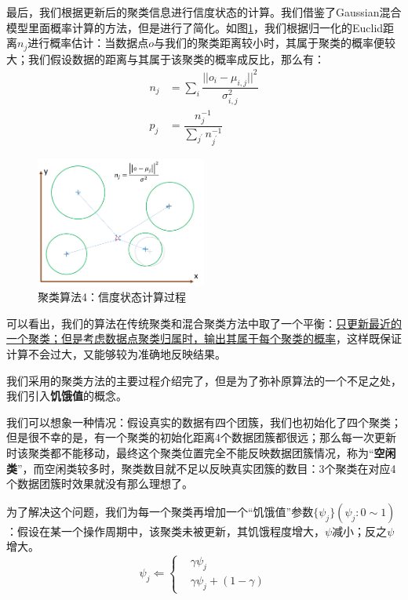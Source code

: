 最后，我们根据更新后的聚类信息进行信度状态的计算。我们借鉴了Gaussian混合模型里面概率计算的方法，但是进行了简化\cite{Young2014Hierarchical}。如图\ref{fig:onlineclus4}，我们根据归一化的Euclid距离$n_j$进行概率估计：当数据点$o$与我们的聚类距离较小时，其属于聚类的概率便较大；我们假设数据的距离与其属于该聚类的概率成反比，那么有：
\begin{equation}
\begin{aligned}
n_j & = \sum_i \dfrac{||o_i-\mu_{i,j}||^2}{\sigma^2_{i,j}} \\
p_j & = \dfrac{n_j^{-1}}{\sum_{j^\prime} n_{j^\prime}^{-1}}
\end{aligned}
\end{equation}

\begin{figure}[htbp]
   \centering
   \includegraphics[width=0.5\textwidth]{OnlineClustering4.png} %
   \caption{聚类算法4：信度状态计算过程}
   \label{fig:onlineclus4}
\end{figure}

可以看出，我们的算法在传统聚类和混合聚类方法中取了一个平衡：\uline{只更新最近的一个聚类；但是考虑数据点聚类归属时，输出其属于每个聚类的概率}，这样既保证计算不会过大，又能够较为准确地反映结果。

我们采用的聚类方法的主要过程介绍完了，但是为了弥补原算法的一个不足之处，我们引入\textbf{饥饿值}的概念\cite{Young2010A}。

我们可以想象一种情况：假设真实的数据有四个团簇，我们也初始化了四个聚类；但是很不幸的是，有一个聚类的初始化距离4个数据团簇都很远；那么每一次更新时该聚类都不能移动，最终这个聚类位置完全不能反映数据团簇情况，称为“\textbf{空闲类}”，而空闲类较多时，聚类数目就不足以反映真实团簇的数目：3个聚类在对应4个数据团簇时效果就没有那么理想了。

为了解决这个问题，我们为每一个聚类再增加一个“饥饿值”参数$\{\psi_j\} (\psi_j:0\sim 1)$：假设在某一个操作周期中，该聚类未被更新，其饥饿程度增大，$\psi$减小；反之$\psi$增大。
\begin{equation}
\psi_j \Leftarrow \left\{
\begin{aligned}
& \gamma \psi_j  \\
& \gamma \psi_j + (1-\gamma)
\end{aligned}
\right.
\end{equation}


